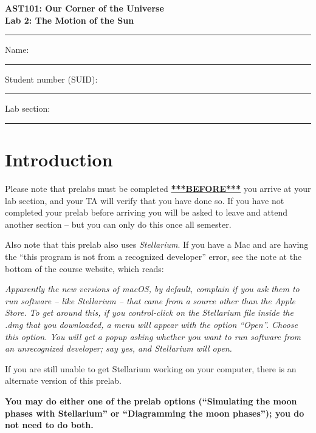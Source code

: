 \documentclass[11pt]{article}
\begin{document}
\begin{center}
\textbf{\Large
AST101: Our Corner of the Universe \\
\vspace*{0.1cm}
Lab 2: The Motion of the Sun  
}
\end{center}

\vspace*{0.5cm}

\hrule
{\Large Name:}\vspace*{0.5cm}\\\hrule
{\Large Student number (SUID):}\vspace*{0.5cm}\\\hrule
{\Large Lab section:}\vspace*{0.5cm}\\\hrule
\vspace*{0.5cm}

\section{Introduction}

Please note that prelabs must be completed \underline{\textbf{***BEFORE***}} you arrive at your lab section, and your TA will verify that you have done so. If you have not completed your prelab before arriving you will be asked to leave and attend another section
-- but you can only do this once all semester.

Also note that this prelab also uses {\it Stellarium}. If you have a Mac and are having the ``this program is not from a 
recognized developer'' error, see the note at the bottom of the course website, which reads:

{\it Apparently the new versions of macOS, by default, complain if you ask them to run software – like Stellarium – that came from a source other than the Apple Store. To get around this, if you control-click on the Stellarium file inside the .dmg that you downloaded, a menu will appear with the option ``Open''. Choose this option. You will get a popup asking whether you want to run software from an unrecognized developer; say yes, and Stellarium will open.}

If you are still unable to get Stellarium working on your computer, there is an alternate version of this prelab.

{\bf You may do either one of the prelab options (``Simulating the moon phases with Stellarium'' or ``Diagramming the moon phases''); you do not need to do both.}
\end{document}
